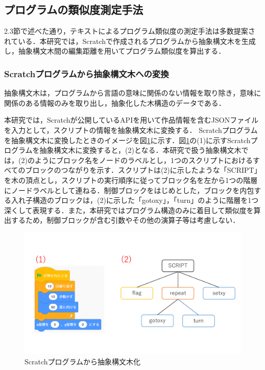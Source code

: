 \documentclass[T,J]{fose} %
\begin{document}
\subsection{プログラムの類似度測定手法}\label{subsec:Similarity program measurement}

2.3節で述べた通り，テキストによるプログラム類似度の測定手法は多数提案されている．本研究では，Scratchで作成されるプログラムから抽象構文木を生成し，抽象構文木間の編集距離を用いてプログラム類似度を算出する．

\subsubsection{Scratchプログラムから抽象構文木への変換}

抽象構文木は，プログラムから言語の意味に関係のない情報を取り除き，意味に関係のある情報のみを取り出し，抽象化した木構造のデータである．

本研究では，Scratchが公開しているAPIを用いて作品情報を含むJSONファイルを入力として，スクリプトの情報を抽象構文木に変換する．
Scratchプログラムを抽象構文木に変換したときのイメージを図\ref{fig:abst}に示す．図\ref{fig:abst}の(1)に示すScratchプログラムを抽象構文木に変換すると，(2)となる．本研究で扱う抽象構文木では，(2)のようにブロック名をノードのラベルとし，1つのスクリプトにおけるすべてのブロックのつながりを示す．スクリプトは(2)に示したような「SCRIPT」を木の頂点とし，スクリプトの実行順序に従ってブロック名を左から1つの階層にノードラベルとして連ねる．制御ブロックをはじめとした，ブロックを内包する入れ子構造のブロックは，(2)に示した「gotoxy」，「turn」のように階層を1つ深くして表現する．また，本研究ではプログラム構造のみに着目して類似度を算出するため，制御ブロックが含む引数やその他の演算子等は考慮しない．
\begin{figure}[t]
	\centering
	\includegraphics[width=1.0\linewidth]{Okamoto_fig/abst.pdf}
	\caption{Scratchプログラムから抽象構文木化}
	\label{fig:abst}
\end{figure}
\end{document}
